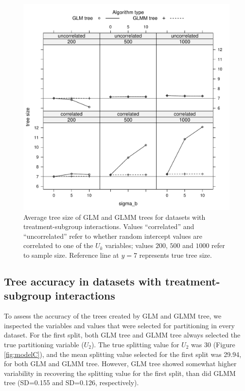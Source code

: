 \documentclass[nobf,doc]{apa}
\begin{document}
\begin{figure}[!htbp]
	\includegraphics[width=12cm]{xy_treesizes_treatsubs.pdf}
	\caption{Average tree size of GLM and GLMM trees for datasets with treatment-subgroup interactions. Values ``correlated'' and ``uncorrelated'' refer to whether random intercept values are correlated to one of the $U_k$ variables; values $200$, $500$ and $1000$ refer to sample size. Reference line at $y=7$ represents true tree size.}
	\label{fig:xyplot_treesize_interact}
\end{figure}
	


 
\subsection{Tree accuracy in datasets with treatment-subgroup interactions}

To assess the accuracy of the trees created by GLM and GLMM tree, we inspected the variables and values that were selected for partitioning in every dataset. For the first split, both GLM tree and GLMM tree always selected the true partitioning variable ($U_2$). The true splitting value for $U_2$ was 30 (Figure \ref{fig:modelC}), and the mean splitting value selected for the first split was 29.94, for both GLM and GLMM tree. However, GLM tree showed somewhat higher variability in recovering the splitting value for the first split, than did GLMM tree (SD=0.155 and SD=0.126, respectively).
\end{document}
